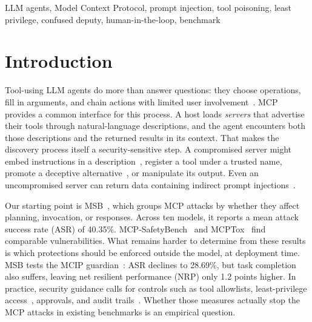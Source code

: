 \documentclass[conference]{IEEEtran}
\begin{document}
\begin{IEEEkeywords}
LLM agents, Model Context Protocol, prompt injection, tool poisoning, least privilege, confused deputy, human-in-the-loop, benchmark
\end{IEEEkeywords}

\section{Introduction}

Tool-using LLM agents do more than answer questions: they choose operations, fill in arguments,
and chain actions with limited user involvement~\cite{yao2023react,schick2023toolformer,qin2024toolllm}. MCP~\cite{mcpspec2025}
provides a common interface for this process. A host loads \emph{servers} that advertise their tools
through natural-language descriptions, and the agent encounters both those descriptions and the
returned results in its context. That makes the discovery process itself a security-sensitive step. A compromised server might embed instructions in a description~\cite{wang2026mcptox,huang2026mcpthreat},
register a tool under a trusted name, promote a deceptive alternative~\cite{shi2026toolhijacker},
or manipulate its output. Even an uncompromised server can return data containing indirect prompt
injections~\cite{greshake2023indirect,zhan2024injecagent,debenedetti2024agentdojo}.

Our starting point is MSB~\cite{zhang2026msb}, which groups MCP attacks by whether they affect
planning, invocation, or responses. Across ten models, it reports a mean attack success rate
(ASR) of 40.35\%. MCP-SafetyBench~\cite{zong2026mcpsafetybench} and MCPTox~\cite{wang2026mcptox}
find comparable vulnerabilities. What remains harder to determine from these results is which protections should be enforced
outside the model, at deployment time. MSB tests the MCIP guardian~\cite{jing2025mcip}: ASR declines to 28.69\%,
but task completion also suffers, leaving net resilient performance (NRP) only 1.2 points higher.
In practice, security guidance calls for controls such as tool allowlists, least-privilege
access~\cite{saltzer1975protection,nist2020sp80053}, approvals, and audit trails~\cite{owasp2025llm,schneier1999audit}.
Whether those measures actually stop the MCP attacks in existing benchmarks is an empirical
question.
\end{document}
